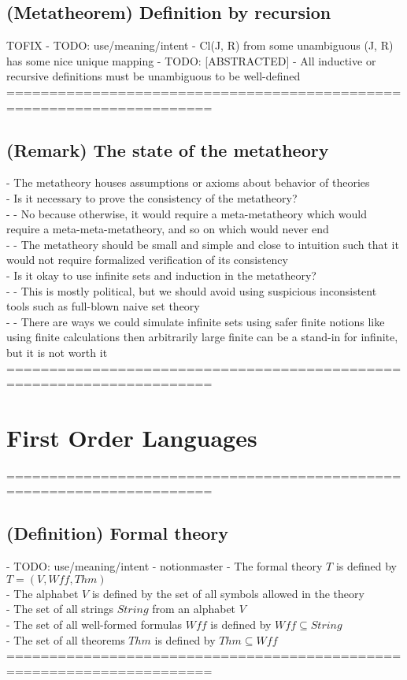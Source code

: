\documentclass{article}
\begin{document}
\subsection{(Metatheorem) Definition by recursion} TOFIX
	- TODO: use/meaning/intent - Cl(J, R) from some unambiguous (J, R) has some nice unique mapping
	- TODO: [ABSTRACTED]
	- All inductive or recursive definitions must be unambiguous to be well-defined
	======================================================================
\subsection{(Remark) The state of the metatheory}
	- The metatheory houses assumptions or axioms about behavior of theories \\
	- Is it necessary to prove the consistency of the metatheory? \\
		- - No because otherwise, it would require a meta-metatheory which would require a meta-meta-metatheory, and so on which would never end \\
		- - The metatheory should be small and simple and close to intuition such that it would not require formalized verification of its consistency \\
	- Is it okay to use infinite sets and induction in the metatheory? \\
		- - This is mostly political, but we should avoid using suspicious inconsistent tools such as full-blown naive set theory \\
		- - There are ways we could simulate infinite sets using safer finite notions like using finite calculations then arbitrarily large finite can be a stand-in for infinite, but it is not worth it \\
	======================================================================

\section{First Order Languages}
	======================================================================
\subsection{(Definition) Formal theory}
	- TODO: use/meaning/intent - notionmaster
	- The formal theory $T$ is defined by $T = (V, Wff, Thm)$ \\ %
	- The alphabet $V$ is defined by the set of all symbols allowed in the theory \\
	- The set of all strings $String$ from an alphabet $V$ \\
	- The set of all well-formed formulas $Wff$ is defined by $Wff \subseteq String$ \\
	- The set of all theorems $Thm$ is defined by $Thm \subseteq Wff$ \\
	======================================================================
\end{document}
